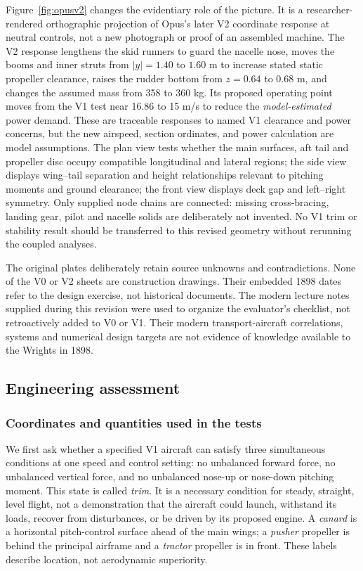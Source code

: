 \documentclass[10pt,letterpaper]{article}
\begin{document}
Figure~\ref{fig:opusv2} changes the evidentiary role of the picture. It is a researcher-rendered orthographic projection of Opus's later V2 coordinate response at neutral controls, not a new photograph or proof of an assembled machine. The V2 response lengthens the skid runners to guard the nacelle nose, moves the booms and inner struts from $|y|=1.40$ to $1.60$ m to increase stated static propeller clearance, raises the rudder bottom from $z=0.64$ to $0.68$ m, and changes the assumed mass from 358 to 360 kg. Its proposed operating point moves from the V1 test near 16.86 to 15 m/s to reduce the \emph{model-estimated} power demand. These are traceable responses to named V1 clearance and power concerns, but the new airspeed, section ordinates, and power calculation are model assumptions. The plan view tests whether the main surfaces, aft tail and propeller disc occupy compatible longitudinal and lateral regions; the side view displays wing--tail separation and height relationships relevant to pitching moments and ground clearance; the front view displays deck gap and left--right symmetry. Only supplied node chains are connected: missing cross-bracing, landing gear, pilot and nacelle solids are deliberately not invented. No V1 trim or stability result should be transferred to this revised geometry without rerunning the coupled analyses.

The original plates deliberately retain source unknowns and contradictions. None of the V0 or V2 sheets are construction drawings. Their embedded 1898 dates refer to the design exercise, not historical documents. The modern lecture notes supplied during this revision were used to organize the evaluator's checklist, not retroactively added to V0 or V1. Their modern transport-aircraft correlations, systems and numerical design targets are not evidence of knowledge available to the Wrights in 1898.

\subsection{Engineering assessment}
\subsubsection{Coordinates and quantities used in the tests}
We first ask whether a specified V1 aircraft can satisfy three simultaneous conditions at one speed and control setting: no unbalanced forward force, no unbalanced vertical force, and no unbalanced nose-up or nose-down pitching moment. This state is called \emph{trim}. It is a necessary condition for steady, straight, level flight, not a demonstration that the aircraft could launch, withstand its loads, recover from disturbances, or be driven by its proposed engine. A \emph{canard} is a horizontal pitch-control surface ahead of the main wings; a \emph{pusher} propeller is behind the principal airframe and a \emph{tractor} propeller is in front. These labels describe location, not aerodynamic superiority.
\end{document}
